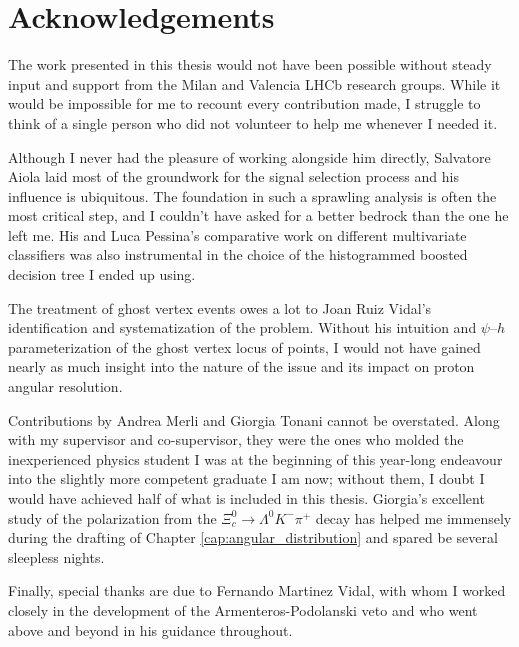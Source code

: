 \chapter*{Acknowledgements}

The work presented in this thesis would not have been possible without steady input and support from the Milan and Valencia LHCb research groups.
While it would be impossible for me to recount every contribution made, I struggle to think of a single person who did not volunteer to help me whenever I needed it. 

Although I never had the pleasure of working alongside him directly, Salvatore Aiola laid most of the groundwork for the \demonstratorshort signal selection process and his influence is ubiquitous.
The foundation in such a sprawling analysis is often the most critical step, and I couldn't have asked for a better bedrock than the one he left me.
His and Luca Pessina's comparative work on different multivariate classifiers was also instrumental in the choice of the histogrammed boosted decision tree I ended up using.

The treatment of ghost vertex \lambdadecay events owes a lot to Joan Ruiz Vidal's identification and systematization of the problem.
Without his intuition and $\psi$--$h$ parameterization of the ghost vertex locus of points, I would not have gained nearly as much insight into the nature of the issue and its impact on proton angular resolution.

Contributions by Andrea Merli and Giorgia Tonani cannot be overstated.
Along with my supervisor and co-supervisor, they were the ones who molded the inexperienced physics student I was at the beginning of this year-long endeavour into the slightly more competent graduate I am now;
without them, I doubt I would have achieved half of what is included in this thesis.
Giorgia's excellent study of the \lz polarization from the $\Xi_c^0 \rightarrow \Lambda^0 K^- \pi^+$ decay has helped me immensely during the drafting of Chapter \ref{cap:angular_distribution} and spared be several sleepless nights.

Finally, special thanks are due to Fernando Martinez Vidal, with whom I worked closely in the development of the Armenteros-Podolanski veto and who went above and beyond in his guidance throughout.